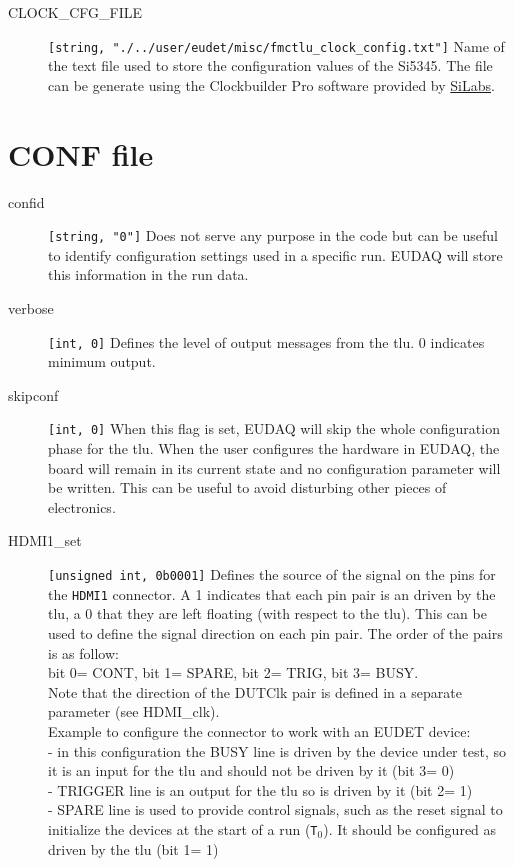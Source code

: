 \begin{description}
  \item[CLOCK\_CFG\_FILE] \verb|[string, "./../user/eudet/misc/fmctlu_clock_config.txt"]| Name of the text file used to store the configuration values of the Si5345. The file can be generate using the Clockbuilder Pro software provided by \href{https://www.silabs.com/products/development-tools/software/clock}{SiLabs}.
\end{description}

\section{CONF file}
\begin{description}
  \item[confid] \verb|[string, "0"]| Does not serve any purpose in the code but can be useful to identify configuration settings used in a specific run. EUDAQ will store this information in the run data.
  \item[verbose] \verb|[int, 0]| Defines the level of output messages from the \gls{tlu}. 0 indicates minimum output.
  \item[skipconf] \verb|[int, 0]| When this flag is set, EUDAQ will skip the whole configuration phase for the \gls{tlu}. When the user configures the hardware in EUDAQ, the board will remain in its current state and no configuration parameter will be written. This can be useful to avoid disturbing other pieces of electronics.
  \item[HDMI1\_set] \verb|[unsigned int, 0b0001]| Defines the source of the signal on the pins for the \verb|HDMI1| connector. A 1 indicates that each pin pair is an driven by the \gls{tlu}, a 0 that they are left floating (with respect to the \gls{tlu}). This can be used to define the signal direction on each pin pair. The order of the pairs is as follow:\\
  bit 0= CONT, bit 1= SPARE, bit 2= TRIG, bit 3= BUSY.\\
  Note that the direction of the DUTClk pair is defined in a separate parameter (see HDMI\_clk).\\
  Example to configure the connector to work with an EUDET device:\\
  - in this configuration the BUSY line is driven by the device under test, so it is an input for the \gls{tlu} and should not be driven by it (bit 3= 0)\\
  - TRIGGER line is an output for the \gls{tlu} so is driven by it (bit 2= 1)\\
  - SPARE line is used to provide control signals, such as the reset signal to initialize the devices at the start of a run (\texttt{T$_0$}). It should be configured as driven by the \gls{tlu} (bit 1= 1)\\

\end{description}

